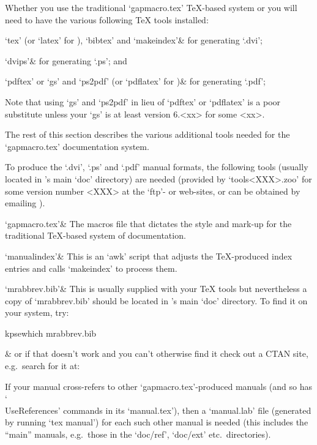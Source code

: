 \enditems


Whether you use the traditional  `gapmacro.tex'  {\TeX}-based  system  or
 you will need to have the various following {\TeX} tools
installed:

\beginitems

`tex' (or `latex' for ), `bibtex' and `makeindex'&
for generating `.dvi';

`dvips'&
for generating `.ps'; and

`pdftex' or `gs' and `ps2pdf' (or `pdflatex' for )&
for generating `.pdf';

\enditems

Note that using `gs' and `ps2pdf' in lieu of `pdftex' or `pdflatex' is  a
poor substitute unless your `gs' is at  least  version  6.<xx>  for  some
<xx>.

The rest of this section describes the various  additional  tools  needed
for the `gapmacro.tex' documentation system.

To produce the `.dvi', `.ps' and `.pdf'  manual  formats,  the  following
{\GAP} tools (usually located  in  {\GAP}'s  main  `doc'  directory)  are
needed (provided by `tools<XXX>.zoo' for some version number <XXX> at the
{\GAP}  `ftp'-  or  web-sites,   or   can   be   obtained   by   emailing
).

\beginitems

`gapmacro.tex'&
The macros file that dictates the style and mark-up for  the  traditional
{\TeX}-based system of {\GAP} documentation.

`manualindex'&
This is an `awk' script that adjusts the  {\TeX}-produced  index  entries
and calls `makeindex' to process them.

`mrabbrev.bib'&
This is usually supplied with your {\TeX} tools but nevertheless  a  copy
of `mrabbrev.bib' should be located in {\GAP}'s main `doc' directory.  To
find it on your system, try:

\begintt
kpsewhich mrabbrev.bib
\endtt

&
or if that doesn't work and you can't otherwise find it check out a  CTAN
site, e.g.~search for it at:

\enditems

If your manual cross-refers to other `gapmacro.tex'-produced manuals (and
so  has  `\\UseReferences'  commands  in  its   `manual.tex'),   then   a
`manual.lab' file (generated by running `tex manual') for each such other
manual is needed (this includes the ``main'' manuals, e.g.~those  in  the
`doc/ref', `doc/ext' etc.~directories).

